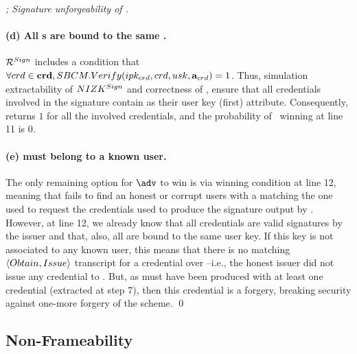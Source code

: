 \begin{proof}[; Signature unforgeability of \CUASGen]
  \paragraph{(d) All {\cred}s are bound to the same \usk.} %
  $\mathcal{R}^{Sign}$ includes a condition that $\forall crd \in \mathbf{crd},
  SBCM.Verify(ipk_{crd},crd,usk,\mathbf{a}_{crd}) = 1$. Thus, simulation
  extractability of $NIZK^{Sign}$ and correctness of \SBCM, ensure that all
  credentials involved in the signature contain \usk as their user key (first)
  attribute. Consequently, \IdentifyCred returns $1$ for all the involved
  credentials, and the probability of \adv~winning at line 11 is $0$.

  \paragraph{(e) \usk must belong to a known user.} %
  The only remaining option for $\adv$ to win is via winning condition at line
  12, meaning that \IdentifySig fails to find an honest or corrupt users with
  a \usk matching the one used to request the credentials used to produce the
  signature output by \adv. However, at line 12, we already know that all
  credentials are valid signatures by the issuer and that, also, all are bound
  to the same user key. If this key is not associated to any known user, this
  means that there is no matching $\langle Obtain,Issue\rangle$ transcript for
  a credential over \usk --i.e., the honest issuer did not issue any credential
  to \usk. But, as \sig must have been produced with at least one credential
  (extracted at step 7), then this credential is a forgery, breaking security
  against one-more forgery of the \SBCM scheme.
  \qed
\end{proof}

\subsection{Non-Frameability}


